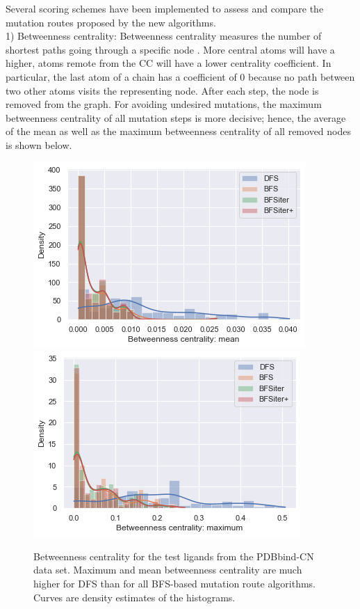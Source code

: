 Several scoring schemes have been implemented to assess and compare
the mutation routes proposed by the new algorithms.\\
1) Betweenness centrality: Betweenness centrality measures the number
of shortest paths going through a specific node \cite{Newman.2010}. More central atoms
will have a higher, atoms remote from
the CC will have a lower centrality coefficient. In particular, the last atom of a chain
has a coefficient of 0 because no path between two other atoms visits
the representing node. After each step, the node is removed from
the graph.
For avoiding undesired mutations, the maximum betweenness centrality
of all mutation steps is more decisive; hence, the average of the mean
as well as the maximum betweenness centrality of all removed nodes
is shown below.

\begin{figure}[H]
	
	\includegraphics[scale=0.8]{betweenness_mean_all}\includegraphics[scale=0.8]{betweenness_max_all}\caption{Betweenness centrality for the test ligands from the PDBbind-CN data set. Maximum and mean betweenness centrality are much higher for DFS than for all BFS-based mutation route algorithms. Curves are density estimates of the histograms.}
	
\end{figure}

